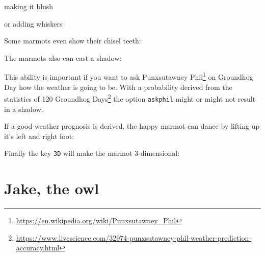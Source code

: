\documentclass[parskip=half]{scrartcl}
\begin{document}
\begin{tcblisting}{}
\marmot[body=SteelBlue]
\end{tcblisting}

making it blush

\begin{tcblisting}{}
\marmot[blush]
\end{tcblisting}

or adding whiskers

\begin{tcblisting}{}
\marmot[whiskers=gray]
\end{tcblisting}

Some marmots even show their chisel teeth:

\begin{tcblisting}{}
\marmot[teeth=white]
\end{tcblisting}

The marmots also can cast a shadow:

\begin{tcblisting}{}
\marmot[shadow]
\end{tcblisting}

This ability is important if you want to ask Punxsutawney Phil\footnote{\url{https://en.wikipedia.org/wiki/Punxsutawney_Phil}} on Groundhog Day how the weather is going to be. With a probability derived from the statistics of 120 Groundhog Days\footnote{\url{https://www.livescience.com/32974-punxsutawney-phil-weather-prediction-accuracy.html}} the option \lstinline|askphil| might or might not result in a shadow.

\begin{tcblisting}{}
\marmot[askphil]
\end{tcblisting}

If a good weather prognosis is derived, the happy marmot can dance by lifting up it's left and right foot: 

\begin{tcblisting}{}
\marmot[leftstep]
\marmot[rightstep,xshift=2cm]
\end{tcblisting}

Finally the key \lstinline|3D| will make the marmot 3-dimensional:

\begin{tcblisting}{}
\marmot[3D]
\end{tcblisting}


\clearpage
\section[Owl]{Jake, the owl}
\end{document}

